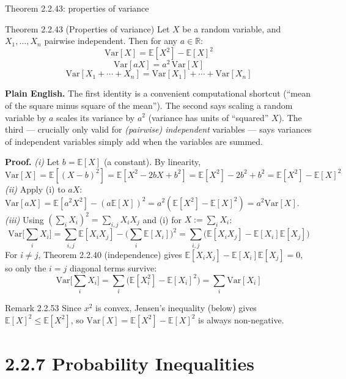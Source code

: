 \documentclass[aspectratio=169,10pt]{beamer}
\begin{document}
\begin{frame}[allowframebreaks]{Theorem 2.2.43: properties of variance}
\begin{block}{Theorem 2.2.43 (Properties of variance)}
Let $X$ be a random variable, and $X_1,\ldots,X_n$ pairwise independent.
Then for any $a\in\mathbb{R}$:
\[ \mathrm{Var}[X] = \mathbb{E}[X^2]-\mathbb{E}[X]^2 \]
\[ \mathrm{Var}[aX] = a^2\,\mathrm{Var}[X] \]
\[ \mathrm{Var}[X_1+\cdots+X_n] = \mathrm{Var}[X_1]+\cdots+\mathrm{Var}[X_n] \]
\end{block}
\textbf{Plain English.} The first identity is a convenient computational
shortcut (``mean of the square minus square of the mean''). The second says
scaling a random variable by $a$ scales its variance by $a^2$ (variance has
units of ``squared'' $X$). The third --- crucially only valid for
\emph{(pairwise) independent} variables --- says variances of independent
variables simply add when the variables are summed.

\framebreak

\textbf{Proof.} \emph{(i)} Let $b=\mathbb{E}[X]$ (a constant). By linearity,
\[ \mathrm{Var}[X] = \mathbb{E}[(X-b)^2] = \mathbb{E}[X^2-2bX+b^2] = \mathbb{E}[X^2]-2b^2+b^2 = \mathbb{E}[X^2]-\mathbb{E}[X]^2 \]
\emph{(ii)} Apply (i) to $aX$:
$\mathrm{Var}[aX]=\mathbb{E}[a^2X^2]-(a\mathbb{E}[X])^2=a^2(\mathbb{E}[X^2]-\mathbb{E}[X]^2)=a^2\mathrm{Var}[X]$.
\emph{(iii)} Using $(\sum_i X_i)^2=\sum_{i,j}X_iX_j$ and (i) for $X:=\sum_i X_i$:
\[ \mathrm{Var}\Big[\sum_i X_i\Big] = \sum_{i,j}\mathbb{E}[X_iX_j] - \Big(\sum_i\mathbb{E}[X_i]\Big)^2 = \sum_{i,j}\big(\mathbb{E}[X_iX_j]-\mathbb{E}[X_i]\mathbb{E}[X_j]\big) \]
For $i\neq j$, Theorem 2.2.40 (independence) gives $\mathbb{E}[X_iX_j]-\mathbb{E}[X_i]\mathbb{E}[X_j]=0$,
so only the $i=j$ diagonal terms survive:
\[ \mathrm{Var}\Big[\sum_i X_i\Big] = \sum_{i}\big(\mathbb{E}[X_i^2]-\mathbb{E}[X_i]^2\big) = \sum_i \mathrm{Var}[X_i] \]

\begin{block}{Remark 2.2.53}
Since $x^2$ is convex, Jensen's inequality (below) gives $\mathbb{E}[X]^2\leq\mathbb{E}[X^2]$,
so $\mathrm{Var}[X]=\mathbb{E}[X^2]-\mathbb{E}[X]^2$ is always non-negative.
\end{block}
\end{frame}

\section{2.2.7 Probability Inequalities}
\end{document}
